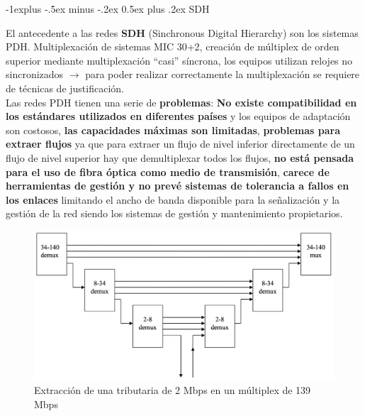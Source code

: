 \documentclass[10pt,portrait, twocolumn]{article}
\makeatletter
\renewcommand{\subsection}{\@startsection{subsection}{2}{0mm}%
                                {-1explus -.5ex minus -.2ex}%
                                {0.5ex plus .2ex}%
                                {\normalfont\normalsize\bfseries}}
\makeatother
\begin{document}
\hrulefill

\subsection{SDH}

El antecedente a las redes \textbf{SDH} (Sinchronous Digital Hierarchy) son los sistemas PDH. Multiplexación de sistemas MIC 30+2, creación de múltiplex de orden superior mediante multiplexación ``casi'' síncrona, los equipos utilizan relojes no sincronizados $\rightarrow$ para poder realizar correctamente la multiplexación se requiere de técnicas de justificación.\\

Las redes PDH tienen una serie de \textbf{problemas}: \textbf{No existe compatibilidad en los estándares utilizados en diferentes países} y los equipos de adaptación son costosos, \textbf{las capacidades máximas son limitadas}, \textbf{problemas para extraer flujos} ya que para extraer un flujo de nivel inferior directamente de un flujo de nivel superior hay que demultiplexar todos los flujos, \textbf{no está pensada para el uso de fibra óptica como medio de transmisión}, \textbf{carece de herramientas de gestión y no prevé sistemas de tolerancia a fallos en los enlaces} limitando el ancho de banda disponible para la señalización y la gestión de la red siendo los sistemas de gestión y mantenimiento propietarios.


	\begin{figure}[!ht]
 		\centering
  		 \includegraphics[scale = 0.3]{images/Extraccion}
		\caption{Extracción de una tributaria de 2 Mbps en un múltiplex de 139 Mbps}
	\end{figure}	
\end{document}
